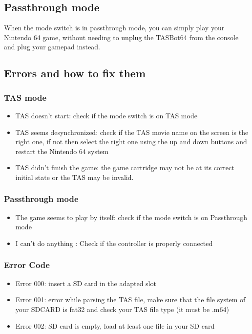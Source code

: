 \documentclass[a4paper,oneside,12pt]{article}
\begin{document}
\subsection{Passthrough mode}
When the mode switch is in passthrough mode, you can simply play your Nintendo
64 game, without needing to unplug the TASBot64 from the console and plug your
gamepad instead.

\subsection{Errors and how to fix them}
\subsubsection{TAS mode}
\begin{itemize}
\item TAS doesn't start: check if the mode switch is on TAS mode
\item TAS seems desynchronized: check if the TAS movie name on the screen is the
  right one, if not then select the right one using the up and down buttons and
  restart the Nintendo 64 system
\item TAS didn't finish the game: the game cartridge may not be at its correct
initial state or the TAS may be invalid.
\end{itemize}

\subsubsection{Passthrough mode}
\begin{itemize}
\item The game seems to play by itself: check if the mode switch is on
Passthrough mode
\item I can't do anything : Check if the controller is properly connected
\end{itemize}

\subsubsection{Error Code}
\begin{itemize}
\item Error 000: insert a SD card in the adapted slot
\item Error 001: error while parsing the TAS file, make sure that the file
system of your SDCARD is fat32 and check your TAS file type (it must be .m64)
\item Error 002: SD card is empty, load at least one file in your SD card
\end{itemize}
\end{document}
